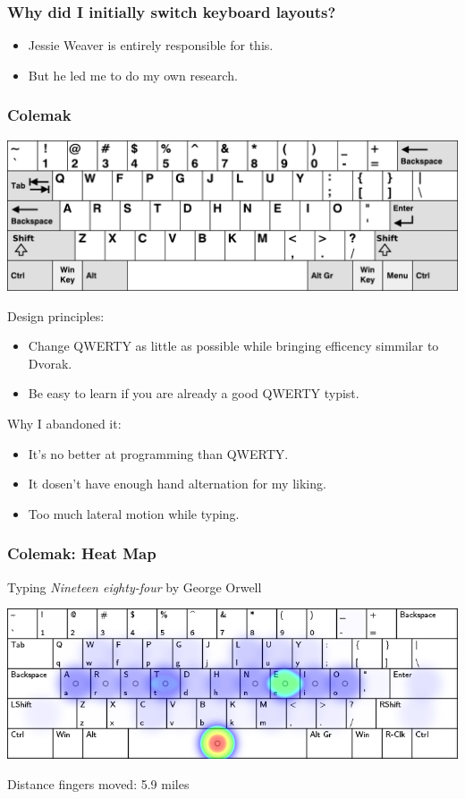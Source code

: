 \documentclass{beamer}
\begin{document}
\begin{frame}
    \frametitle{Why did I initially switch keyboard layouts?}
    \pause
    \begin{itemize}[<+->]
        \item Jessie Weaver is entirely responsible for this.
        \item But he led me to do my own research.
    \end{itemize}
\end{frame}

\begin{frame}
    \frametitle{Colemak}
    \begin{center}
        \includegraphics[width=0.8\linewidth]{graphics/colemak}\par
    \end{center}
    \pause
    Design principles:
    \begin{itemize}
        \item Change QWERTY as little as possible while bringing efficency
            simmilar to Dvorak.
        \item Be easy to learn if you are already a good QWERTY typist.
    \end{itemize}
    \pause
    Why I abandoned it:
    \begin{itemize}
        \item It's no better at programming than QWERTY.
        \item It dosen't have enough hand alternation for my liking.
        \item Too much lateral motion while typing.
    \end{itemize}
\end{frame}

\begin{frame}
    \frametitle{Colemak: Heat Map}
    Typing \emph{Nineteen eighty-four} by George Orwell
    \begin{center}
        \includegraphics[width=\linewidth]{graphics/colemakheat}\par
    Distance fingers moved: 5.9 miles
    \end{center}
\end{frame}
\end{document}
